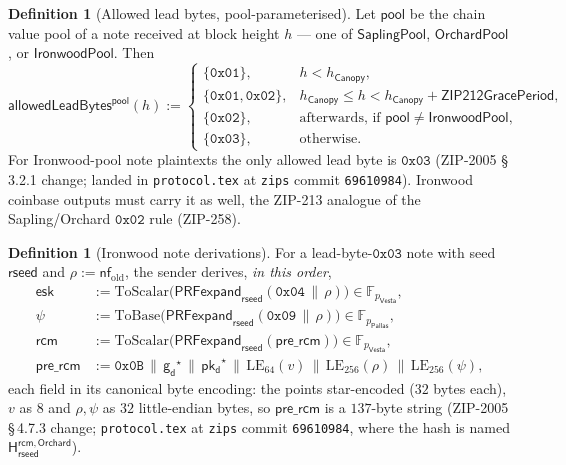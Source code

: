 \documentclass[11pt,a4paper]{article}
\theoremstyle{definition}
\newtheorem{definition}[theorem]{Definition}
\newcommand{\F}{\mathbb{F}}
\newcommand{\nfsym}{\mathsf{nf}}
\newcommand{\Pallas}{\ensuremath{\mathsf{Pallas}}}
\newcommand{\Vesta}{\ensuremath{\mathsf{Vesta}}}
\newcommand{\pkd}{\ensuremath{\mathsf{pk_d}}}
\newcommand{\gd}{\ensuremath{\mathsf{g_d}}}
\newcommand{\rcm}{\ensuremath{\mathsf{rcm}}}
\begin{document}
\begin{definition}[Allowed lead bytes, pool-parameterised]%
\label{def:iw-leadbytes}
Let $\mathsf{pool}$ be the chain value pool of a note received at block
height $h$ --- one of $\mathsf{SaplingPool}$, $\mathsf{OrchardPool}$, or
$\mathsf{IronwoodPool}$. Then
\[
\mathsf{allowedLeadBytes}^{\mathsf{pool}}(h) :=
\begin{cases}
\{\mathtt{0x01}\}, & h < h_{\mathsf{Canopy}}, \\
\{\mathtt{0x01}, \mathtt{0x02}\}, & h_{\mathsf{Canopy}} \le h <
h_{\mathsf{Canopy}} + \mathsf{ZIP212GracePeriod}, \\
\{\mathtt{0x02}\}, & \text{afterwards, if } \mathsf{pool} \ne
\mathsf{IronwoodPool}, \\
\{\mathtt{0x03}\}, & \text{otherwise}.
\end{cases}
\]
For Ironwood-pool note plaintexts the only allowed lead byte is
$\mathtt{0x03}$ (ZIP-2005 \S\,3.2.1 change; landed in \texttt{protocol.tex}
at \texttt{zips} commit \texttt{69610984}). Ironwood coinbase outputs must
carry it as well, the ZIP-213 analogue of the Sapling/Orchard
$\mathtt{0x02}$ rule (ZIP-258).
\end{definition}

\begin{definition}[Ironwood note derivations]\label{def:iw-derive}
For a lead-byte-$\mathtt{0x03}$ note with seed $\mathsf{rseed}$ and
$\rho := \nfsym_{\mathrm{old}}$, the sender derives, \emph{in this order},
\begin{align*}
\mathsf{esk} &:= \mathrm{ToScalar}\bigl(\mathsf{PRFexpand}_{\mathsf{rseed}}
(\mathtt{0x04} \,\|\, \rho)\bigr) \in \F_{p_{\Vesta}}, \\
\psi &:= \mathrm{ToBase}\bigl(\mathsf{PRFexpand}_{\mathsf{rseed}}
(\mathtt{0x09} \,\|\, \rho)\bigr) \in \F_{p_{\Pallas}}, \\
\rcm &:= \mathrm{ToScalar}\bigl(\mathsf{PRFexpand}_{\mathsf{rseed}}
(\mathsf{pre\_rcm})\bigr) \in \F_{p_{\Vesta}}, \\
\mathsf{pre\_rcm} &:= \mathtt{0x0B} \,\|\, \gd^\star \,\|\, \pkd^\star
\,\|\, \mathrm{LE}_{64}(v) \,\|\, \mathrm{LE}_{256}(\rho) \,\|\,
\mathrm{LE}_{256}(\psi),
\end{align*}
each field in its canonical byte encoding: the points star-encoded ($32$
bytes each), $v$ as $8$ and $\rho, \psi$ as $32$ little-endian bytes, so
$\mathsf{pre\_rcm}$ is a $137$-byte string (ZIP-2005 \S\,4.7.3 change;
\texttt{protocol.tex} at \texttt{zips} commit \texttt{69610984}, where the
hash is named $\mathsf{H}^{\mathsf{rcm,Orchard}}_{\mathsf{rseed}}$).
\end{definition}
\end{document}
